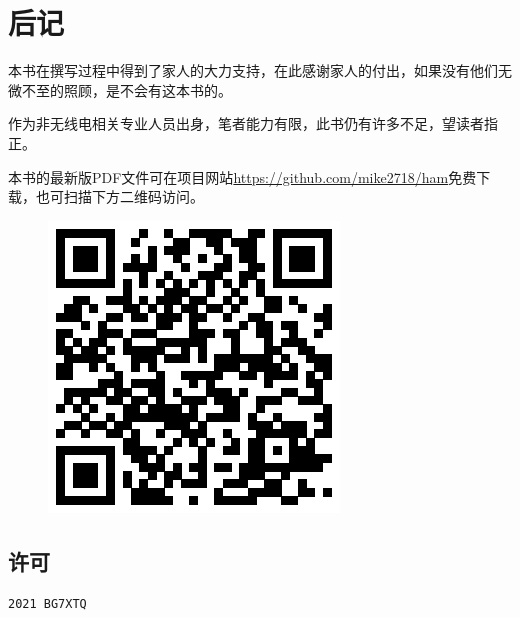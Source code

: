 \chapter*{后记}

本书在撰写过程中得到了家人的大力支持，在此感谢家人的付出，如果没有他们无微不至的照顾，是不会有这本书的。

作为非无线电相关专业人员出身，笔者能力有限，此书仍有许多不足，望读者指正。

本书的最新版PDF文件可在项目网站\url{https://github.com/mike2718/ham}免费下载，也可扫描下方二维码访问。

\begin{figure}[h]
	\includegraphics{site}
	\centering
\end{figure}

\section*{许可}

\sffamily\textcopyright \texttt{2021 BG7XTQ}